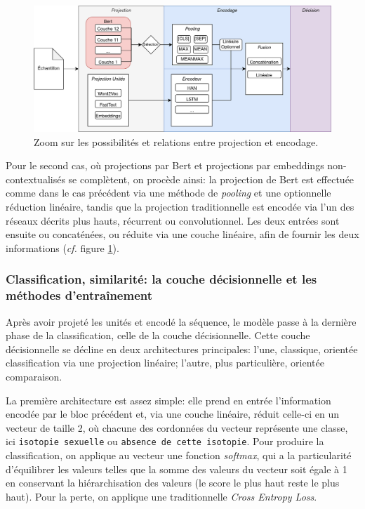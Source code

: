 \begin{figure}[ht]
    \centering
    \includegraphics[width=\linewidth]{figures/chap4/BertZoom.png}
    \caption{Zoom sur les possibilités et relations entre projection et encodage.}
    \label{fig:chap4:zoom-projection}
\end{figure}

Pour le second cas, où projections par Bert et projections par embeddings non-contextualisés se complètent, on procède ainsi: la projection de Bert est effectuée comme dans le cas précédent via une méthode de \textit{pooling} et une optionnelle réduction linéaire, tandis que la projection traditionnelle est encodée via l'un des réseaux décrits plus hauts, récurrent ou convolutionnel. Les deux entrées sont ensuite ou concaténées, ou réduite via une couche linéaire, afin de fournir les deux informations (\textit{cf.} figure \ref{fig:chap4:zoom-projection}).

\subsubsection{Classification, similarité: la couche décisionnelle et les méthodes d'entraînement}

Après avoir projeté les unités et encodé la séquence, le modèle passe à la dernière phase de la classification, celle de la couche décisionnelle. Cette couche décisionnelle se décline en deux architectures principales: l'une, classique, orientée classification via une projection linéaire; l'autre, plus particulière, orientée comparaison.

La première architecture est assez simple: elle prend en entrée l'information encodée par le bloc précédent et, via une couche linéaire, réduit celle-ci en un vecteur de taille 2, où chacune des cordonnées du vecteur représente une classe, ici \texttt{isotopie sexuelle} ou \texttt{absence de cette isotopie}. Pour produire la classification, on applique au vecteur une fonction \textit{softmax}, qui a la particularité d'équilibrer les valeurs telles que la somme des valeurs du vecteur soit égale à 1 en conservant la hiérarchisation des valeurs (le score le plus haut reste le plus haut). Pour la perte, on applique une traditionnelle \textit{Cross Entropy Loss}.

